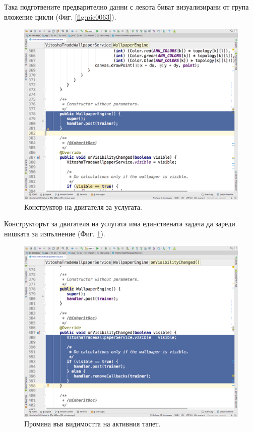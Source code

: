 \documentclass[book,14pt,oneside,openany]{memoir}
\begin{document}
Така подготвените предварително данни с лекота биват визуализирани от група вложение цикли (Фиг. \ref{fig:pic0063}).

\begin{figure}[h]
  \centering
  \includegraphics[height=0.45\pdfpageheight]{pic0064}
  \caption{Конструктор на двигателя за услугата.}
\label{fig:pic0064}
\end{figure}
\FloatBarrier

Конструкторът за двигателя на услугата има единствената задача да зареди нишката за изпълнение (Фиг. \ref{fig:pic0064}).

\begin{figure}[h]
  \centering
  \includegraphics[height=0.45\pdfpageheight]{pic0065}
  \caption{Промяна във видимостта на активния тапет.}
\label{fig:pic0065}
\end{figure}
\FloatBarrier
\end{document}

